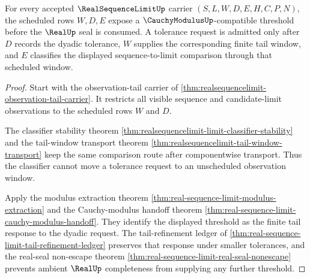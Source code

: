 \begin{theorem}\label{thm:realsequencelimit-cauchy-modulus-extraction}
For every accepted $\RealSequenceLimitUp$ carrier $(S,L,W,D,E,H,C,P,N)$, the scheduled rows $W,D,E$ expose a $\CauchyModulusUp$-compatible threshold before the $\RealUp$ seal is consumed. A tolerance request is admitted only after $D$ records the dyadic tolerance, $W$ supplies the corresponding finite tail window, and $E$ classifies the displayed sequence-to-limit comparison through that scheduled window.
\end{theorem}
\begin{proof}
Start with the observation-tail carrier of \autoref{thm:realsequencelimit-observation-tail-carrier}. It restricts all visible sequence and candidate-limit observations to the scheduled rows $W$ and $D$.

The classifier stability theorem \autoref{thm:realsequencelimit-limit-classifier-stability} and the tail-window transport theorem \autoref{thm:realsequencelimit-tail-window-transport} keep the same comparison route after componentwise transport. Thus the classifier cannot move a tolerance request to an unscheduled observation window.

Apply the modulus extraction theorem \autoref{thm:real-sequence-limit-modulus-extraction} and the Cauchy-modulus handoff theorem \autoref{thm:real-sequence-limit-cauchy-modulus-handoff}. They identify the displayed threshold as the finite tail response to the dyadic request. The tail-refinement ledger of \autoref{thm:real-sequence-limit-tail-refinement-ledger} preserves that response under smaller tolerances, and the real-seal non-escape theorem \autoref{thm:real-sequence-limit-real-seal-nonescape} prevents ambient $\RealUp$ completeness from supplying any further threshold.
\end{proof}

